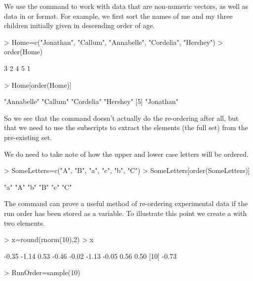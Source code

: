  
 
We use the  command to work with data that are non-numeric vectors, as well as data in  or  format. For example, we first sort the names of me and my three children initially given in descending order of age. 

\begin{Schunk}
\begin{Sinput}
> Home=c("Jonathan", "Callum", "Annabelle", "Cordelia", "Hershey") 
> order(Home) 
\end{Sinput}
\begin{Soutput}
[1] 3 2 4 5 1
\end{Soutput}
\begin{Sinput}
> Home[order(Home)] 
\end{Sinput}
\begin{Soutput}
[1] "Annabelle" "Callum"    "Cordelia"  "Hershey"  
[5] "Jonathan" 
\end{Soutput}
\end{Schunk}

 
So we see that the  command doesn't actually do the re-ordering after all, but that we need to use the subscripts to extract the elements (the full set) from the pre-existing set. 
 
We do need to take note of how the upper and lower case letters will be ordered. 

\begin{Schunk}
\begin{Sinput}
> SomeLetters=c("A", "B", "a", "c", "b", "C") 
> SomeLetters[order(SomeLetters)] 
\end{Sinput}
\begin{Soutput}
[1] "a" "A" "b" "B" "c" "C"
\end{Soutput}
\end{Schunk}

 
The  command can prove a useful method of re-ordering experimental data if the run order has been stored as a variable. To illustrate this point we create a  with two elements. 

\begin{Schunk}
\begin{Sinput}
> x=round(rnorm(10),2) 
> x 
\end{Sinput}
\begin{Soutput}
 [1] -0.35 -1.14  0.53 -0.46 -0.02 -1.13 -0.05  0.56  0.50
[10] -0.73
\end{Soutput}
\begin{Sinput}
> RunOrder=sample(10) 
\end{Sinput}
\end{Schunk}

